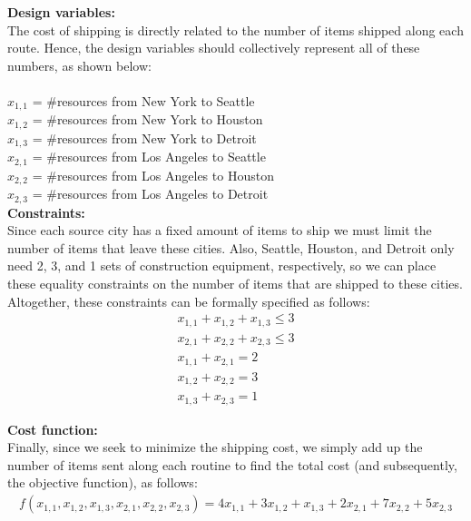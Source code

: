\documentclass[11pt]{article}
\begin{document}
\begin{prob}{2}
\end{prob}
\begin{sol} 

\textbf{Design variables:}\\ 
The cost of shipping is directly related to the number of items shipped along each route. Hence, the design variables should collectively represent all of these numbers, as shown below: \\ \\
$x_{1,1}$ = \#resources from New York to Seattle\\
$x_{1,2}$ = \#resources from New York to Houston\\
$x_{1,3}$ = \#resources from New York to Detroit \\
$x_{2,1}$ = \#resources from Los Angeles to Seattle \\
$x_{2,2}$ = \#resources from Los Angeles to Houston \\
$x_{2,3}$ = \#resources from Los Angeles to Detroit \\

\textbf{Constraints:} \\
Since each source city has a fixed amount of items to ship we must limit the number of items that leave these cities. Also, Seattle, Houston, and Detroit only need 2, 3, and 1 sets of construction equipment, respectively, so we can place these equality constraints on the number of items that are shipped to these cities. Altogether, these constraints can be formally specified as follows: 
\begin{eqnarray*}
x_{1,1} + x_{1,2} + x_{1,3} \leq 3 \\
x_{2,1} + x_{2,2} + x_{2,3} \leq 3 \\
x_{1,1} + x_{2,1} = 2 \\
x_{1,2} + x_{2,2} = 3 \\
x_{1,3} + x_{2,3} = 1 
\end{eqnarray*}

\textbf{Cost function:} \\
Finally, since we seek to minimize the shipping cost, we simply add up the number of items sent along each routine to find the total cost (and subsequently, the objective function), as follows:
\begin{eqnarray*}
f(x_{1,1},x_{1,2},x_{1,3},x_{2,1},x_{2,2},x_{2,3}) = 4x_{1,1} + 3x_{1,2} + x_{1,3} + 2x_{2,1} + 7x_{2,2} + 5x_{2,3}
\end{eqnarray*}


\end{sol}
\end{document}

